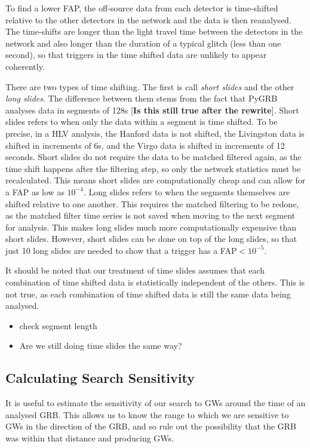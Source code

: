 \documentclass[11pt]{cuthesis}
\begin{document}
To find a lower FAP, the off-source data from each detector is time-shifted relative to the other detectors in the network and the data is then reanalysed. The time-shifts are longer than the light travel time between the detectors in the network and also longer than the duration of a typical glitch (less than one second), so that triggers in the time shifted data are unlikely to appear coherently.  

There are two types of time shifting. The first is call \textit{short slides} and the other \textit{long slides}. The difference between them stems from the fact that PyGRB analyses data in segments of 128s [\textbf{Is this still true after the rewrite}]. Short slides refers to when only the data within a segment is time shifted. To be precise, in a HLV analysis, the Hanford data is not shifted, the Livingston data is shifted in increments of 6s, and the Virgo data is shifted in increments of 12 seconds. Short slides do not require the data to be matched filtered again, as the time shift happens after the filtering step, so only the network statistics must be recalculated. This means short slides are computationally cheap and can allow for a FAP as low as $10^{-4}$. Long slides refers to when the segments themselves are shifted relative to one another. This requires the matched filtering to be redone, as the matched filter time series is not saved when moving to the next segment for analysis. This makes long slides much more computationally expensive than short slides. However, short slides can be done on top of the long slides, so that just 10 long slides are needed to show that a trigger has a FAP$<10^{-5}$.

It should be noted that our treatment of time slides assumes that each combination of time shifted data is statistically independent of the others. This is not true, as each combination of time shifted data is still the same data being analysed. 

\begin{itemize}
\item check segment length
\item Are we still doing time slides the same way?
\end{itemize}


\subsection{Calculating Search Sensitivity}
It is useful to estimate the sensitivity of our search to GWs around the time of an analysed GRB. This allows us to know the range to which we are sensitive to GWs in the direction of the GRB, and so rule out the possibility that the GRB was within that distance and producing GWs. 
\end{document}
